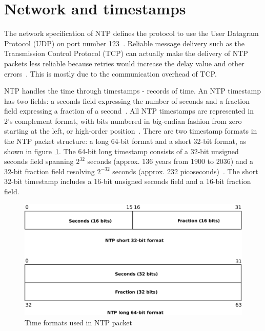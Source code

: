 
\section{Network and timestamps}\label{sec:ntp-network}
The network specification of NTP defines
the protocol to use the User Datagram Protocol (UDP) on port number 123~\cite{ianna-ports,rfc5905}.
Reliable message delivery such as the Transmission Control Protocol (TCP)
can actually make the delivery of
NTP packets less reliable because retries
would increase the delay value and other errors~\cite{rfc5905}.
This is mostly due to the communication overhead of TCP.

NTP handles the time through timestamps - records of time.
An NTP timestamp has two fields: a seconds field expressing the number of seconds
and a fraction field expressing a fraction of a second~\cite{rfc5905}.
All NTP timestamps are represented in 2's complement format, with
bits numbered in big-endian fashion from zero starting at the left, or high-order position~\cite{rfc5905}.
There are two timestamp formats in the NTP packet structure:
a long 64-bit format and a short 32-bit format, as shown in figure~\ref{fig:ntp-timestamps}.
The 64-bit long timestamp consists of a 32-bit unsigned seconds
field spanning $2^{32}$ seconds (approx. 136 years from 1900 to 2036) and a 32-bit fraction field resolving
$2^{-32}$ seconds (approx. 232 picoseconds)~\cite{rfc5905}.
The short 32-bit timestamp includes a 16-bit unsigned seconds field
and a 16-bit fraction field.

\begin{figure}
	\centering
	\includegraphics[width=13cm,keepaspectratio]{fig/ntp-timestamps.pdf}
	\caption{Time formats used in NTP packet}
	\label{fig:ntp-timestamps}
	\bigskip
\end{figure}

